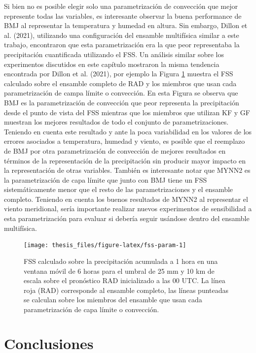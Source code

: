 \documentclass[12pt,oneside,a4paper]{reedthesis}
\begin{document}
Si bien no es posible elegir solo una parametrización de convección que mejor represente todas las variables, es interesante observar la buena performance de BMJ al representar la temperatura y humedad en altura. Sin embargo, Dillon et al. (2021), utilizando una configuración del ensamble multifísica similar a este trabajo, encontraron que esta parametrización era la que peor representaba la precipitación cuantificada utilizando el FSS. Un análisis similar sobre los experimentos discutidos en este capítulo mostraron la misma tendencia encontrada por Dillon et al. (2021), por ejemplo la Figura \ref{fig:fss-param} muestra el FSS calculado sobre el ensamble completo de RAD y los miembros que usan cada parametrización de campa límite o convección. En esta Figura se observa que BMJ es la parametrización de convección que peor representa la precipitación desde el punto de vista del FSS mientras que los miembros que utilizan KF y GF muestran los mejores resultados de todo el conjunto de parametrizaciones. Teniendo en cuenta este resultado y ante la poca variabilidad en los valores de los errores asociados a temperatura, humedad y viento, es posible que el reemplazo de BMJ por otra parametrización de convección de mejores resultados en términos de la representación de la precipitación sin producir mayor impacto en la representación de otras variables. También es interesante notar que MYNN2 es la parametrización de capa límite que junto con BMJ tiene un FSS sistemáticamente menor que el resto de las parametrizaciones y el ensamble completo. Teniendo en cuenta los buenos resultados de MYNN2 al representar el viento meridional, sería importante realizar nuevos experimentos de sensibilidad a esta parametrización para evaluar si debería seguir usándose dentro del ensamble multifísica.




\begin{figure}

\texttt{[image: thesis\_files/figure-latex/fss-param-1]} \hfill{}

\caption{FSS calculado sobre la precipitación acumulada a 1 hora en una ventana móvil de 6 horas para el umbral de 25 mm y 10 km de escala sobre el pronóstico RAD inicializado a las 00 UTC. La línea roja (RAD) corresponde al ensamble completo, las líneas punteadas se calculan sobre los miembros del ensamble que usan cada parametrización de capa límite o convección.}\label{fig:fss-param}
\end{figure}
\hypertarget{conclusiones-1}{%
\section{Conclusiones}\label{conclusiones-1}}
\end{document}

